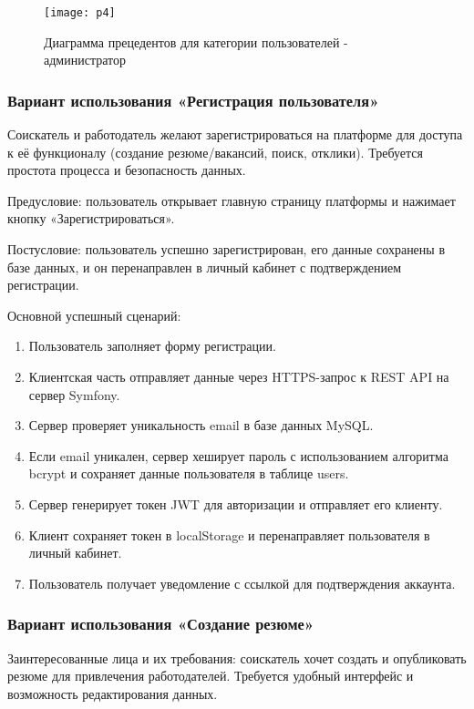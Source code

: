 \begin{figure}[H]
	\texttt{[image: p4]}
	\caption{Диаграмма прецедентов для категории пользователей - администратор}
	\label{p4:image}
\end{figure}

\subsubsection{Вариант использования «Регистрация пользователя»}
Соискатель и работодатель желают зарегистрироваться на платформе для доступа к её функционалу (создание резюме/вакансий, поиск, отклики). Требуется простота процесса и безопасность данных.

Предусловие: пользователь открывает главную страницу платформы и нажимает кнопку «Зарегистрироваться».

Постусловие: пользователь успешно зарегистрирован, его данные сохранены в базе данных, и он перенаправлен в личный кабинет с подтверждением регистрации.

Основной успешный сценарий:

\begin{enumerate}
	\item Пользователь заполняет форму регистрации.
	\item Клиентская часть отправляет данные через HTTPS-запрос к REST API на сервер Symfony.
	\item Сервер проверяет уникальность email в базе данных MySQL.
	\item Если email уникален, сервер хеширует пароль с использованием алгоритма bcrypt и сохраняет данные пользователя в таблице users.
	\item Сервер генерирует токен JWT для авторизации и отправляет его клиенту.
	\item Клиент сохраняет токен в localStorage и перенаправляет пользователя в личный кабинет.
	\item Пользователь получает уведомление с ссылкой для подтверждения аккаунта.
\end{enumerate}

\subsubsection{Вариант использования «Создание резюме»}
Заинтересованные лица и их требования: соискатель хочет создать и опубликовать резюме для привлечения работодателей. Требуется удобный интерфейс и возможность редактирования данных.

